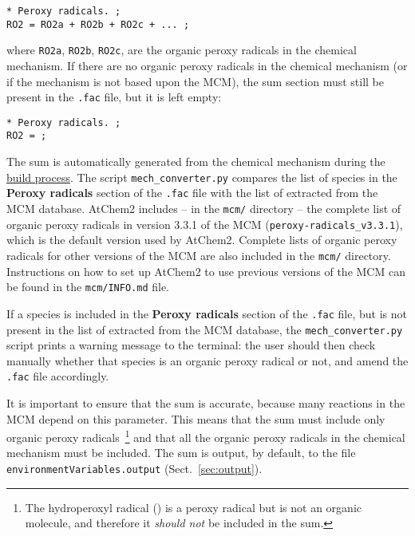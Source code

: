 \begin{verbatim}
* Peroxy radicals. ;
RO2 = RO2a + RO2b + RO2c + ... ;
\end{verbatim}

where \texttt{RO2a}, \texttt{RO2b}, \texttt{RO2c}, are the organic
peroxy radicals in the chemical mechanism. If there are no organic
peroxy radicals in the chemical mechanism (or if the mechanism is not
based upon the MCM), the  sum section must still be present in
the \texttt{.fac} file, but it is left empty:

\begin{verbatim}
* Peroxy radicals. ;
RO2 = ;
\end{verbatim}

The  sum is automatically generated from the chemical
mechanism during the \hyperref[subsec:build-process]{build process}.
The script \texttt{mech\_converter.py} compares the list of species in
the \textbf{Peroxy radicals} section of the \texttt{.fac} file with the
list of  extracted from the MCM database. AtChem2 includes --
in the \texttt{mcm/} directory -- the complete list of organic peroxy
radicals in version 3.3.1 of the MCM (\texttt{peroxy-radicals\_v3.3.1}),
which is the default version used by AtChem2. Complete lists of
organic peroxy radicals for other versions of the MCM are also
included in the \texttt{mcm/} directory. Instructions on how to set up
AtChem2 to use previous versions of the MCM can be found in the
\texttt{mcm/INFO.md} file.

If a species is included in the \textbf{Peroxy radicals} section of the
\texttt{.fac} file, but is not present in the list of 
extracted from the MCM database, the \texttt{mech\_converter.py}
script prints a warning message to the terminal: the user should then
check manually whether that species is an organic peroxy radical or
not, and amend the \texttt{.fac} file accordingly.

It is important to ensure that the  sum is accurate, because
many reactions in the MCM depend on this parameter. This means that
the  sum must include only organic peroxy
radicals~\footnote{The hydroperoxyl radical () is a peroxy
  radical but is not an organic molecule, and therefore it
  \emph{should not} be included in the  sum.} and that all the
organic peroxy radicals in the chemical mechanism must be
included. The  sum is output, by default, to the file
\texttt{environmentVariables.output} (Sect.~\ref{sec:output}).

